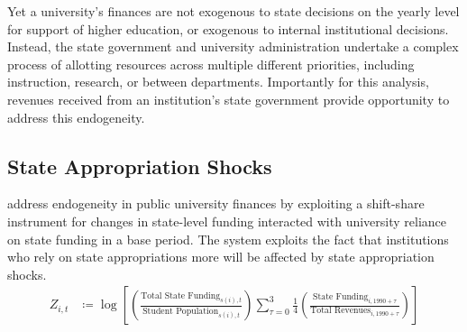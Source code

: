 \documentclass[notitlepage,12pt]{article}
\begin{document}
Yet a university's finances are not exogenous to state decisions on the yearly level for support of higher education, or exogenous to internal institutional decisions.
Instead, the state government and university administration undertake a complex process of allotting resources across multiple different priorities, including instruction, research, or between departments.
Importantly for this analysis, revenues received from an institution's state government provide opportunity to address this endogeneity.


\subsection{State Appropriation Shocks}
\label{sec:approp-shocks}

\cite{NBERw23736,chakrabarti2018effect,NBERw27885} address endogeneity in public university finances by exploiting a shift-share instrument for changes in state-level funding interacted with university reliance on state funding in a base period.
The system exploits the fact that institutions who rely on state appropriations more will be affected by state appropriation shocks.
\begin{align}
    \label{eqn:public-instrument}
    Z_{i,t} &\coloneqq \log \left[
    \left( \frac{\text{Total State Funding}_{s(i),t}}{\text{Student Population}_{s(i),t}} \right)
    \sum_{\tau = 0}^{3} \frac 14
    \left( \frac{\text{State Funding}_{i,1990 + \tau}}{\text{Total Revenues}_{i,1990 + \tau}} \right) \right]
\end{align}
\end{document}
